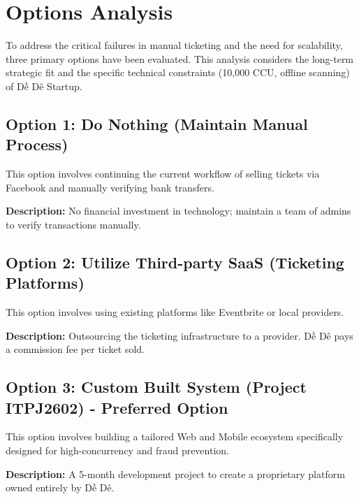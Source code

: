 \chapter{Options Analysis}
To address the critical failures in manual ticketing and the need for scalability, three primary options have been evaluated. This analysis considers the long-term strategic fit and the specific technical constraints (10,000 CCU, offline scanning) of Dề Dê Startup.

\section{Option 1: Do Nothing (Maintain Manual Process)}

This option involves continuing the current workflow of selling tickets via Facebook and manually verifying bank transfers.

\textbf{Description:} No financial investment in technology; maintain a team of admins to verify transactions manually.

\section{Option 2: Utilize Third-party SaaS (Ticketing Platforms)}

This option involves using existing platforms like Eventbrite or local providers.

\textbf{Description:} Outsourcing the ticketing infrastructure to a provider. Dề Dê pays a commission fee per ticket sold.

\section{Option 3: Custom Built System (Project ITPJ2602) - Preferred Option}

This option involves building a tailored Web and Mobile ecosystem specifically designed for high-concurrency and fraud prevention.

\textbf{Description:} A 5-month development project to create a proprietary platform owned entirely by Dề Dê.

\vspace{0.5cm}

